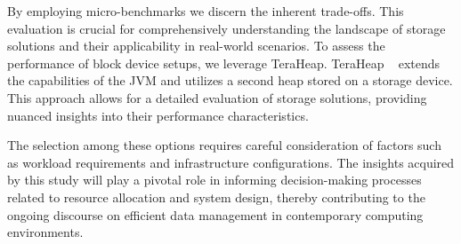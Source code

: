 By employing micro-benchmarks we discern the inherent trade-offs. This
evaluation is crucial for comprehensively understanding the landscape of storage
solutions and their applicability in real-world scenarios. To assess the
performance of block device setups, we leverage TeraHeap. TeraHeap ~\cite{teraheap} extends the
capabilities of the JVM and utilizes a second heap stored on a storage device.
This approach allows for a detailed evaluation of storage solutions, providing
nuanced insights into their performance characteristics.

The selection among these options requires careful consideration of factors such
as workload requirements and infrastructure configurations. The insights
acquired by this study will play a pivotal role in informing decision-making
processes related to resource allocation and system design, thereby contributing
to the ongoing discourse on efficient data management in contemporary computing
environments.

